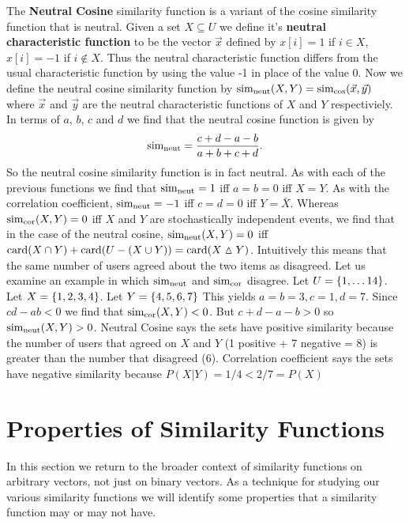 \documentclass{article}
\begin{document}
\begin{example}
The \textbf{Neutral Cosine} similarity function is a variant of the cosine
similarity function that is neutral. Given a set $X\subseteq U$ we define it's
\textbf{neutral characteristic function} to be the vector $\vec{x}$ defined by
$x[i]=1$ if $i\in X$, $x[i]=-1$ if $i\notin X$. Thus the neutral characteristic
function differs from the usual characteristic function by using the value -1 in
place of the value 0. Now we define the neutral cosine similarity function by
$\operatorname{sim_{neut}}(X,Y) = \operatorname{sim_{cos}}(\vec{x},\vec{y})$ where $\vec{x}$ and $\vec{y}$ are the
neutral characteristic functions of $X$ and $Y$ respectiviely. In terms of $a$,
$b$, $c$ and $d$ we find that the neutral cosine function is given by
\begin{equation}
\operatorname{sim_{neut}} = \frac{c+d-a-b}{a+b+c+d}.
\end{equation}
So the neutral cosine similarity function is in fact neutral. As with each of
the previous functions we find that $\operatorname{sim_{neut}}=1$ iff $a=b=0$ iff $X=Y$. As with the
correlation coefficient, $\operatorname{sim_{neut}}=-1$ iff $c=d=0$ iff $Y = \bar{X}$. 
Whereas $\operatorname{sim_{cor}}(X,Y)=0$ iff $X$ and $Y$ are stochastically independent events, we
find that in the case of the neutral cosine, $\operatorname{sim_{neut}}(X,Y)=0$ iff $\operatorname{card}(X\cap
Y)+\operatorname{card}(U-(X\cup Y)) = \operatorname{card}(X \vartriangle Y)$. Intuitively this means that
the same number of users agreed about the two items as disagreed. Let us examine
an example in which $\operatorname{sim_{neut}}$ and $\operatorname{sim_{cor}}$ disagree. Let
$U=\left\{1,\dots 14\right\}$. Let $X=\left\{1,2,3, 4\right\}$. Let
$Y=\left\{4,5,6,7\right\}$ This yields $a=b=3, c=1, d=7$. Since $cd-ab<0$ we find
that $\operatorname{sim_{cor}}(X,Y)<0$. But $c+d-a-b>0$ so $\operatorname{sim_{neut}}(X,Y)>0$. Neutral Cosine
says the sets have positive similarity because the number of users that agreed
on $X$ and
$Y$ (1 positive + 7 negative = 8) is greater than the number that disagreed (6).
Correlation coefficient
says the sets have negative similarity because $P(X|Y)=1/4 < 2/7 = P(X)$
\end{example}

\section{Properties of Similarity Functions}
In this section we return to the broader context of similarity functions on
arbitrary vectors, not just on binary vectors. As a technique for studying our
various similarity functions we will identify some properties that a similarity
function may or may not have.
\end{document}
